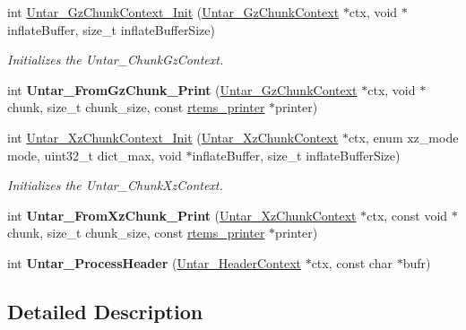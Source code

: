 \begin{DoxyCompactItemize}
\item 
int \mbox{\hyperlink{group__libmisc__untar__img_ga88650d94dd642342aabc5cfcb7eb01b9}{Untar\+\_\+\+Gz\+Chunk\+Context\+\_\+\+Init}} (\mbox{\hyperlink{structUntar__GzChunkContext}{Untar\+\_\+\+Gz\+Chunk\+Context}} $\ast$ctx, void $\ast$inflate\+Buffer, size\+\_\+t inflate\+Buffer\+Size)
\begin{DoxyCompactList}\small\item\em Initializes the Untar\+\_\+\+Chunk\+Gz\+Context. \end{DoxyCompactList}\item 
\mbox{\label{group__libmisc__untar__img_gaec39b7600ad8ab7add150cba6e643cab}} 
int {\bfseries Untar\+\_\+\+From\+Gz\+Chunk\+\_\+\+Print} (\mbox{\hyperlink{structUntar__GzChunkContext}{Untar\+\_\+\+Gz\+Chunk\+Context}} $\ast$ctx, void $\ast$chunk, size\+\_\+t chunk\+\_\+size, const \mbox{\hyperlink{structrtems__printer}{rtems\+\_\+printer}} $\ast$printer)
\item 
int \mbox{\hyperlink{group__libmisc__untar__img_ga814ea61fa29546ca49041e5c60f2b2f1}{Untar\+\_\+\+Xz\+Chunk\+Context\+\_\+\+Init}} (\mbox{\hyperlink{structUntar__XzChunkContext}{Untar\+\_\+\+Xz\+Chunk\+Context}} $\ast$ctx, enum xz\+\_\+mode mode, uint32\+\_\+t dict\+\_\+max, void $\ast$inflate\+Buffer, size\+\_\+t inflate\+Buffer\+Size)
\begin{DoxyCompactList}\small\item\em Initializes the Untar\+\_\+\+Chunk\+Xz\+Context. \end{DoxyCompactList}\item 
\mbox{\label{group__libmisc__untar__img_ga19ef8d9bb01e2db5042efcbaab42c83f}} 
int {\bfseries Untar\+\_\+\+From\+Xz\+Chunk\+\_\+\+Print} (\mbox{\hyperlink{structUntar__XzChunkContext}{Untar\+\_\+\+Xz\+Chunk\+Context}} $\ast$ctx, const void $\ast$chunk, size\+\_\+t chunk\+\_\+size, const \mbox{\hyperlink{structrtems__printer}{rtems\+\_\+printer}} $\ast$printer)
\item 
\mbox{\label{group__libmisc__untar__img_ga38412609fd81e41f5f65265b0d315d98}} 
int {\bfseries Untar\+\_\+\+Process\+Header} (\mbox{\hyperlink{structUntar__HeaderContext}{Untar\+\_\+\+Header\+Context}} $\ast$ctx, const char $\ast$bufr)
\end{DoxyCompactItemize}


\subsection{Detailed Description}


